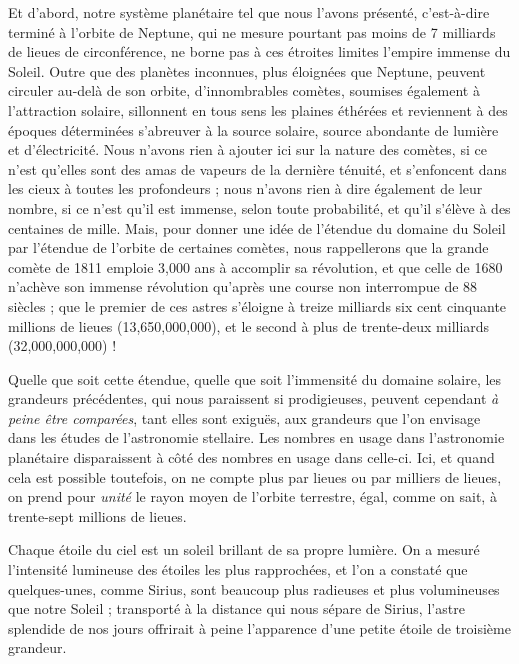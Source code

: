 \documentclass[a4paper, 11pt, oneside]{article}
\begin{document}
Et d'abord, notre système planétaire tel que nous l'avons présenté, c'est-à-dire terminé à l'orbite de Neptune, qui ne mesure pourtant pas moins de 7 milliards de lieues de circonférence, ne borne pas à ces étroites limites l'empire immense du Soleil. Outre que des planètes inconnues, plus éloignées que Neptune, peuvent circuler au-delà de son orbite, d'innombrables comètes, soumises également à l'attraction solaire, sillonnent en tous sens les plaines éthérées et reviennent à des époques déterminées s'abreuver à la source solaire, source abondante de lumière et d'électricité. Nous n'avons rien à ajouter ici sur la nature des comètes, si ce n'est qu'elles sont des amas de vapeurs de la dernière ténuité, et s'enfoncent dans les cieux à toutes les profondeurs ; nous n'avons rien à dire également de leur nombre, si ce n'est qu'il est immense, selon toute probabilité, et qu'il s'élève à des centaines de mille. Mais, pour donner une idée de l'étendue du domaine du Soleil par l'étendue de l'orbite de certaines comètes, nous rappellerons que la grande comète de 1811 emploie 3,000 ans à accomplir sa révolution, et que celle de 1680 n'achève son immense révolution qu'après une course non interrompue de 88 siècles ; que le premier de ces astres s'éloigne à treize milliards six cent cinquante millions de lieues (13,650,000,000), et le second à plus de trente-deux milliards (32,000,000,000) !

Quelle que soit cette étendue, quelle que soit l'immensité du domaine solaire, les grandeurs précédentes, qui nous paraissent si prodigieuses, peuvent cependant \emph{à peine être comparées}, tant elles sont exiguës, aux grandeurs que l'on envisage dans les études de l'astronomie stellaire. Les nombres en usage dans l'astronomie planétaire disparaissent à côté des nombres en usage dans celle-ci. Ici, et quand cela est possible toutefois, on ne compte plus par lieues ou par milliers de lieues, on prend pour \emph{unité} le rayon moyen de l'orbite terrestre, égal, comme on sait, à trente-sept millions de lieues.

Chaque étoile du ciel est un soleil brillant de sa propre lumière. On a mesuré l'intensité lumineuse des étoiles les plus rapprochées, et l'on a constaté que quelques-unes, comme Sirius, sont beaucoup plus radieuses et plus volumineuses que notre Soleil ; transporté à la distance qui nous sépare de Sirius, l'astre splendide de nos jours offrirait à peine l'apparence d'une petite étoile de troisième grandeur.
\end{document}
